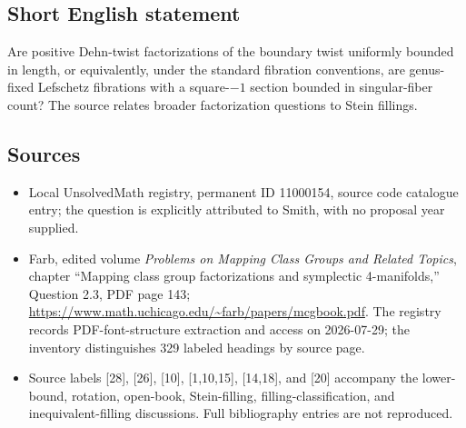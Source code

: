 \documentclass[11pt]{article}
\begin{document}
\subsection{Short English statement}
Are positive Dehn-twist factorizations of the boundary twist uniformly bounded in length, or equivalently, under the standard fibration conventions, are genus-fixed Lefschetz fibrations with a square-$-1$ section bounded in singular-fiber count? The source relates broader factorization questions to Stein fillings.
\subsection{Sources}
\begin{itemize}
\item Local UnsolvedMath registry, permanent ID 11000154, source code catalogue entry; the question is explicitly attributed to Smith, with no proposal year supplied.
\item Farb, edited volume \emph{Problems on Mapping Class Groups and Related Topics}, chapter ``Mapping class group factorizations and symplectic 4-manifolds,'' Question 2.3, PDF page 143; \url{https://www.math.uchicago.edu/~farb/papers/mcgbook.pdf}. The registry records PDF-font-structure extraction and access on 2026-07-29; the inventory distinguishes 329 labeled headings by source page.
\item Source labels [28], [26], [10], [1,10,15], [14,18], and [20] accompany the lower-bound, rotation, open-book, Stein-filling, filling-classification, and inequivalent-filling discussions. Full bibliography entries are not reproduced.
\end{itemize}
\end{document}
